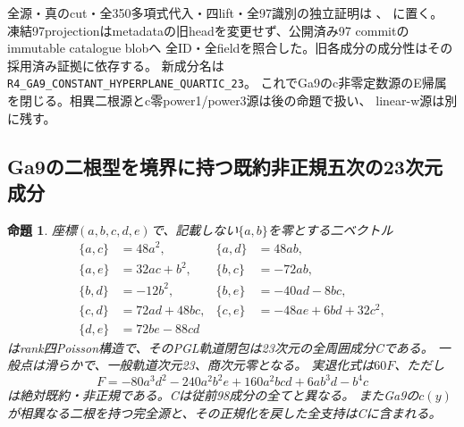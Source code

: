 \documentclass[a4paper,11pt]{ltjsarticle}
\newtheorem{proposition}{命題}[section]
\theoremstyle{definition}
\begin{document}
全源・真のcut・全350多項式代入・四lift・全97識別の独立証明は
、
に置く。
凍結97projectionはmetadataの旧headを変更せず、公開済み97 commitのimmutable catalogue blobへ
全ID・全fieldを照合した。旧各成分の成分性はその採用済み証拠に依存する。
新成分名は\texttt{R4\_GA9\_CONSTANT\_HYPERPLANE\_QUARTIC\_23}。
これでGa9のc非零定数源のE帰属を閉じる。相異二根源とc零power1/power3源は後の命題で扱い、
linear-w源は別に残す。

\subsection{Ga9の二根型を境界に持つ既約非正規五次の23次元成分}
\begin{proposition}\label{prop:Ga9-distinct-quintic-component}
座標$(a,b,c,d,e)$で、記載しない$\{a,b\}$を零とする二ベクトル
\[
\begin{aligned}
 \{a,c\}&=48a^2,&\{a,d\}&=48ab,\\
 \{a,e\}&=32ac+b^2,&\{b,c\}&=-72ab,\\
 \{b,d\}&=-12b^2,&\{b,e\}&=-40ad-8bc,\\
 \{c,d\}&=72ad+48bc,&\{c,e\}&=-48ae+6bd+32c^2,\\
 \{d,e\}&=72be-88cd
\end{aligned}
\]
はrank四Poisson構造で、そのPGL軌道閉包は23次元の全周囲成分Cである。
一般点は滑らかで、一般軌道次元23、商次元零となる。
実退化式は$60F$、ただし
\[
 F=-80a^3d^2-240a^2b^2e+160a^2bcd+6ab^3d-b^4c
\]
は絶対既約・非正規である。Cは従前98成分の全てと異なる。
またGa9の$c(y)$が相異なる二根を持つ完全源と、その正規化を戻した全支持はCに含まれる。
\end{proposition}
\end{document}
